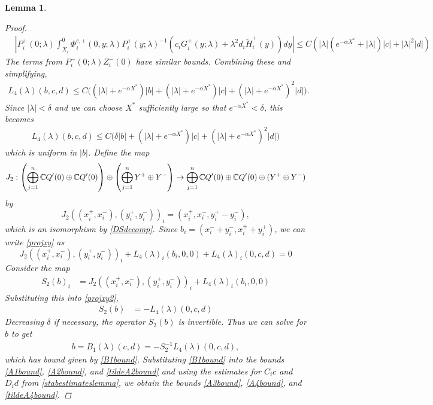 \documentclass[10pt,reqno]{amsart}
\theoremstyle{plain}
\newtheorem{lemma}[theorem]{Lemma}
\theoremstyle{definition}
\theoremstyle{remark}
\numberwithin{theorem}{section}
\numberwithin{equation}{section}
\begin{document}
\begin{lemma}
\begin{proof}
\begin{align*}
&\left| P_i^+(0; \lambda) \int_{X_i}^0 \Phi_i^{c,+}(0, y; \lambda) P_i^+(y; \lambda)^{-1}( c_i G_i^+(y; \lambda) + \lambda^2 d_i \tilde{H}_i^+(y)) dy  \right| \leq C \left( |\lambda|(e^{-\alpha X^*} + |\lambda|)|c| + |\lambda|^2 |d| \right)
\end{align*}
The terms from $P_i^-(0; \lambda) Z_i^-(0)$ have similar bounds. Combining these and simplifying,
\begin{align*}
L_4(\lambda)(b, c, d) \leq 
C\Big( (|\lambda| + e^{-\alpha X^*})|b| + (|\lambda|+e^{-\alpha X^*})|c| + (|\lambda| + e^{-\alpha X^*})^2 |d|  \Big).
\end{align*}
Since $|\lambda| < \delta$ and we can choose $X^*$ sufficiently large so that $e^{-\alpha X^*} < \delta$, this becomes
\begin{align*}
L_4(\lambda)(b, c, d) \leq 
C\Big( \delta |b| + (|\lambda|+e^{-\alpha X^*})|c| + (|\lambda| + e^{-\alpha X^*})^2 |d| \Big) 
\end{align*}
which is uniform in $|b|$. Define the map
\[
J_2: \left( \bigoplus_{j=1}^n \mathbb{C} Q'(0) \oplus \mathbb{C} Q'(0)  \right) \oplus
\left( \bigoplus_{j=1}^n Y^+ \oplus Y^- \right) 
\rightarrow \bigoplus_{j=1}^n \mathbb{C} Q'(0) \oplus \mathbb{C} Q'(0) \oplus (Y^+ \oplus Y^-)
\]
by 
\[
J_2( (x_i^+, x_i^-),(y_i^+, y_i^-))_i = ( x_i^+, x_i^-, y_i^+ - y_i^- ),
\]
which is an isomorphism by \cref{DSdecomp}. Since $b_i = (x_i^- + y_i^-, x_i^+ + y_i^+)$, we can write \cref{projxy} as
\begin{equation}\label{projxy2}
J_2( (x_i^+, x_i^-),(y_i^+, y_i^-))_i 
+ L_4(\lambda)_i(b_i, 0, 0) + L_4(\lambda)_i(0, c, d) = 0
\end{equation}
Consider the map
\begin{align*}
S_2(b)_i &= J_2( (x_i^+, x_i^-),(y_i^+, y_i^-))_i 
+ L_4(\lambda)_i(b_i, 0, 0) 
\end{align*}
Substituting this into \cref{projxy2},
\begin{align*}
S_2(b) &= -L_4(\lambda)(0, c, d)
\end{align*}
Decreasing $\delta$ if necessary, the operator $S_2(b)$ is invertible. Thus we can solve for $b$ to get
\begin{align}
b = B_1(\lambda)(c,d) 
= -S_2^{-1} L_4(\lambda)(0, c, d),
\end{align}
which has bound given by \cref{B1bound}. Substituting \cref{B1bound} into the bounds \cref{A1bound}, \cref{A2bound}, and \cref{tildeA2bound} and using the estimates for $C_i c$ and $D_i d $ from \cref{stabestimateslemma}, we obtain the bounds \cref{A3bound}, \cref{A4bound}, and \cref{tildeA4bound}.
\end{proof}
\end{lemma}
\end{document}
